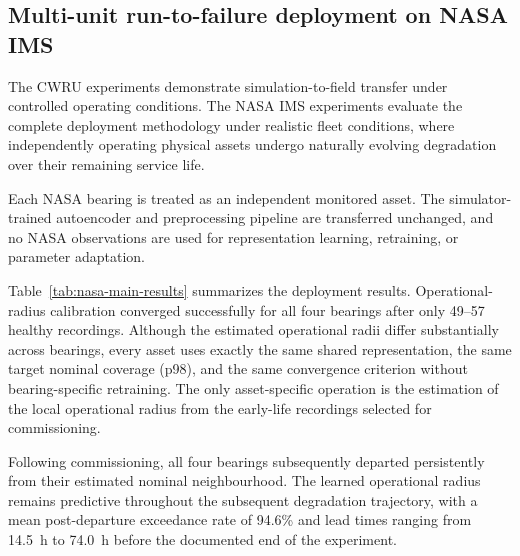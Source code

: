 \documentclass{trbunofficial}
\begin{document}
\subsection{Multi-unit run-to-failure deployment on NASA IMS}
\label{sec:nasa-results}

The CWRU experiments demonstrate simulation-to-field transfer under controlled
operating conditions. The NASA IMS experiments evaluate the complete deployment
methodology under realistic fleet conditions, where independently operating
physical assets undergo naturally evolving degradation over their remaining
service life.

Each NASA bearing is treated as an independent monitored asset. The
simulator-trained autoencoder and preprocessing pipeline are transferred
unchanged, and no NASA observations are used for representation learning,
retraining, or parameter adaptation.

Table~\ref{tab:nasa-main-results} summarizes the deployment results.
Operational-radius calibration converged successfully for all four bearings
after only 49--57 healthy recordings. Although the estimated operational
radii differ substantially across bearings, every asset uses exactly the same
shared representation, the same target nominal coverage (p98), and the same
convergence criterion without bearing-specific retraining.
The only asset-specific operation is the estimation of the local operational
radius from the early-life recordings selected for commissioning.

Following commissioning, all four bearings subsequently departed persistently from their estimated nominal neighbourhood.
The learned operational radius remains predictive throughout the subsequent degradation trajectory, with a mean
post-departure exceedance rate of 94.6\% and lead times ranging from
14.5~h to 74.0~h before the documented end of the experiment.
\end{document}
